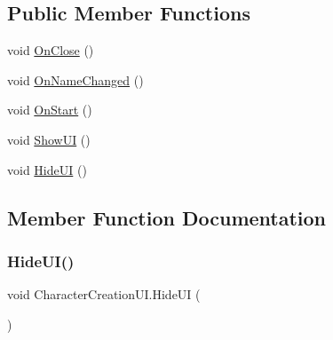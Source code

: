 \subsection*{Public Member Functions}
\begin{DoxyCompactItemize}
\item 
void \mbox{\hyperlink{class_character_creation_u_i_a3a3792f0c251839acb08848c3bf0e6e0}{On\+Close}} ()
\item 
void \mbox{\hyperlink{class_character_creation_u_i_a07db6ab68cff5c8d43ed3809e45efe0c}{On\+Name\+Changed}} ()
\item 
void \mbox{\hyperlink{class_character_creation_u_i_a656b1552f06f9611f9672489e03f8936}{On\+Start}} ()
\item 
void \mbox{\hyperlink{class_character_creation_u_i_a5e683c30d28a4c97d8f84de3de2062cd}{Show\+UI}} ()
\item 
void \mbox{\hyperlink{class_character_creation_u_i_a1724d7136e40f03376f720ec0ecb2d83}{Hide\+UI}} ()
\end{DoxyCompactItemize}


\subsection{Member Function Documentation}
\mbox{\label{class_character_creation_u_i_a1724d7136e40f03376f720ec0ecb2d83}} 
\subsubsection{\texorpdfstring{HideUI()}{HideUI()}}
{\footnotesize\ttfamily void Character\+Creation\+U\+I.\+Hide\+UI (\begin{DoxyParamCaption}{ }\end{DoxyParamCaption})}


